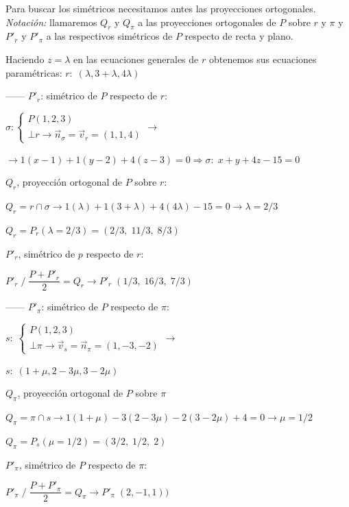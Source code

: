 \begin{proofw}\renewcommand{\qedsymbol}{$\diamond$}	
\noindent Para buscar los simétricos necesitamos antes las proyecciones ortogonales. \textit{Notación:} llamaremos $Q_r$ y $Q_{\pi}$ a las proyecciones ortogonales de $P$ sobre $r$ y $\pi$ y $P'_r$ y $P'_{\pi}$ a las respectivos simétricos de $P$ respecto de recta y plano.

\noindent Haciendo $z=\lambda$ en las ecuaciones generales de $r$ obtenemos sus ecuaciones paramétricas: $r:\; (\lambda,3+\lambda,4\lambda)$

\noindent ------ $P'_r$: simétrico de $P$ respecto de $r$: 

\noindent $\sigma:\begin{cases} P(1,2,3) \\ \bot r \to \vec n_{\sigma}=\vec v_r=(1,1,4)\end{cases}\to$

\noindent $\to 1(x-1)+1(y-2)+4(z-3)=0 \Rightarrow \sigma:\; x+y+4z-15=0$

\noindent $Q_r$, proyección ortogonal de $P$ sobre $r$:

\noindent $Q_r=r\cap \sigma \to 1(\lambda)+1(3+\lambda)+4(4\lambda)-15=0 \to \lambda=2/3$

\noindent $Q_r=P_r(\lambda=2/3)=(2/3,\; 11/3,\; 8/3)$	

\noindent $P'_r$, simétrico de $p$ respecto de $r$:

\noindent $P'_r \;/\; \dfrac {P+P'_r}{2}=Q_r \to P'_r\;(1/3,\; 16/3,\; 7/3)$

\noindent ------ $P'_{\pi}$: simétrico de $P$ respecto de ${\pi}$:

\noindent $s:\; \begin{cases} P(1,2,3) \\ \bot \pi \to \vec v_s=\vec n_{\pi}=(1,-3,-2) \end{cases}\to$

\noindent $s:\; (1+\mu,2-3\mu,3-2\mu)$

\noindent $Q_{\pi}$, proyección ortogonal de $P$ sobre $\pi$

\noindent $Q_{\pi}=\pi \cap s\to 1(1+\mu)-3(2-3\mu)-2(3-2\mu)+4=0 \to \mu=1/2$

\noindent $Q_{\pi}=P_s(\mu=1/2)=(3/2,\; 1/2,\;2)$

\noindent $P'_{\pi}$, simétrico de $P$ respecto de $\pi$:

\noindent  $P'_{\pi} \;/\; \dfrac {P+P'_{\pi}}{2}=Q_{\pi} \to P'_{\pi}\;(2,-1,1))$
\end{proofw}


